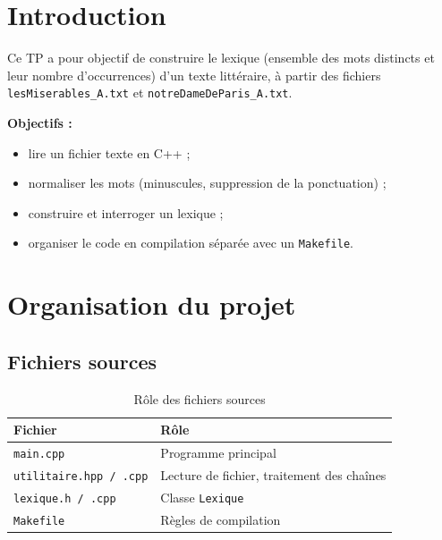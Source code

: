 \documentclass[a4paper,12pt,french]{article}
\begin{document}
\section{Introduction}

Ce TP a pour objectif de construire le lexique (ensemble des mots distincts et
leur nombre d'occurrences) d'un texte littéraire, à partir des fichiers
\texttt{lesMiserables\_A.txt} et \texttt{notreDameDeParis\_A.txt}.

\begin{cadregris}
  \textbf{Objectifs :}
  \begin{itemize}
    \item lire un fichier texte en C++ ;
    \item normaliser les mots (minuscules, suppression de la ponctuation) ;
    \item construire et interroger un lexique ;
    \item organiser le code en compilation séparée avec un \texttt{Makefile}.
  \end{itemize}
\end{cadregris}



\pagebreak
\section{Organisation du projet}
\subsection{Fichiers sources}

\begin{table}[ht!]
	\begin{center}
		\begin{tabular}{@{}ll@{}}
			\toprule
			\textbf{Fichier} & \textbf{Rôle} \\ \midrule
			\texttt{main.cpp}              & Programme principal \\
			\texttt{utilitaire.hpp / .cpp} & Lecture de fichier, traitement des chaînes \\
			\texttt{lexique.h / .cpp}      & Classe \texttt{Lexique} \\
			\texttt{Makefile}              & Règles de compilation \\ \bottomrule
		\end{tabular}
		\caption{Rôle des fichiers sources}
		\label{tab:fichiers}
	\end{center}
\end{table}
\end{document}

